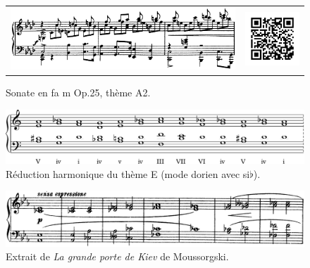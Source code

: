\begin{figure}[!p]
  \begin{bigcenter}
    \begin{tabular}{lr}
      \includegraphics[width=12.5cm, keepaspectratio]{sonate-theme-A2.png}
      &
      \includegraphics[width=3cm, keepaspectratio]{op1-qr.png}
    \end{tabular}
  \end{bigcenter}
  \caption{\label{sonate-theme-12}Sonate en fa m Op.25, thème A2.}
\end{figure}

\begin{figure}[!p]
  \begin{bigcenter}
    \includegraphics[width=15cm, keepaspectratio]{religioso.pdf}
  \end{bigcenter}
  \caption{\label{sonate-theme-5-reduction}Réduction harmonique du thème E (mode dorien avec si$\flat$).}
\end{figure}

\begin{figure}[!ht]
  \begin{bigcenter}
    \includegraphics[width=15cm, keepaspectratio]{kiev.png}
  \end{bigcenter}
  \caption{\label{grande-porte-de-kiev}Extrait de \emph{La grande porte de Kiev} de Moussorgski.}
\end{figure}

